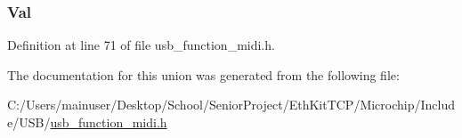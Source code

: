 \hypertarget{union_u_s_b___a_u_d_i_o___m_i_d_i___e_v_e_n_t___p_a_c_k_e_t_a1a2aefd22f32fe19c7a40fd62958b591}{}
\subsubsection[{Val}]{ Val}\label{union_u_s_b___a_u_d_i_o___m_i_d_i___e_v_e_n_t___p_a_c_k_e_t_a1a2aefd22f32fe19c7a40fd62958b591}


Definition at line 71 of file usb\+\_\+function\+\_\+midi.\+h.



The documentation for this union was generated from the following file\+:\begin{DoxyCompactItemize}
\item 
C\+:/\+Users/mainuser/\+Desktop/\+School/\+Senior\+Project/\+Eth\+Kit\+T\+C\+P/\+Microchip/\+Include/\+U\+S\+B/\hyperlink{usb__function__midi_8h}{usb\+\_\+function\+\_\+midi.\+h}\end{DoxyCompactItemize}
